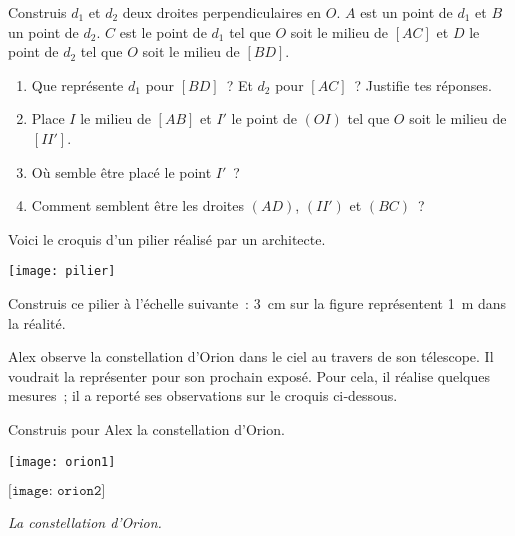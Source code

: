 \begin{exercice}
Construis $d_1$ et $d_2$ deux droites perpendiculaires en $O$. $A$ est un point de $d_1$ et $B$ un point de $d_2$. $C$ est le point de $d_1$ tel que $O$ soit le milieu de $[AC]$ et $D$ le point de $d_2$ tel que $O$ soit le milieu de $[BD]$.
\begin{enumerate}
 \item Que représente $d_1$ pour $[BD]$ ? Et $d_2$ pour $[AC]$ ? Justifie tes réponses.
 \item Place $I$ le milieu de $[AB]$ et $I'$ le point de $(OI)$ tel que $O$ soit le milieu de $[II']$.
 \item Où semble être placé le point $I'$ ?
 \item Comment semblent être les droites $(AD)$, $(II')$ et $(BC)$ ?
 \end{enumerate}
\end{exercice}


\begin{exercice}
Voici le croquis d'un pilier réalisé par un architecte.
\begin{center} \texttt{[image: pilier]} \end{center}
Construis ce pilier à l’échelle suivante : 3 cm sur la figure représentent 1 m dans la réalité.
\end{exercice}


\begin{exercice}[Orion]
Alex observe la constellation d'Orion dans le ciel au travers de son télescope. Il voudrait la représenter pour son prochain exposé. Pour cela, il réalise quelques mesures ; il a reporté ses observations sur le croquis ci‑dessous.

Construis pour Alex la constellation d'Orion.
\begin{center} \texttt{[image: orion1]} \end{center}
\begin{center} $\boxed{\texttt{[image: orion2]}}$ 

{\footnotesize\emph{La constellation d'Orion.}} \end{center}
\end{exercice}